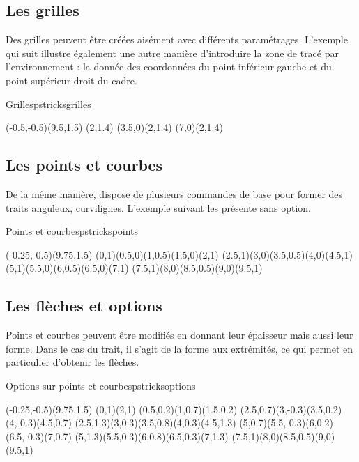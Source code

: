 \subsection{Les grilles}

Des grilles peuvent être créées aisément avec différents paramétrages. L'exemple qui suit illustre également une autre manière d'introduire la zone de tracé par l'environnement  : la donnée des coordonnées du point inférieur gauche et du point supérieur droit du cadre.

\begin{codedoublefig}{Grilles}{pstricksgrilles}
\begin{pspicture}(-0.5,-0.5)(9.5,1.5)
\psgrid(2,1.4)
\rput(3.5,0){\psgrid[griddots=10,subgriddiv=3,subgridcolor=bleu6](2,1.4)}
\rput(7,0){\psgrid[gridwidth=0.07,subgriddiv=0](2,1.4)}
\end{pspicture}
\end{codedoublefig}

\subsection{Les points et courbes}

De la même manière,  dispose de plusieurs commandes de base pour former des traits anguleux, curvilignes. L'exemple suivant les présente sans option.

\begin{codedoublefig}{Points et courbes}{pstrickspoints}
\begin{pspicture}(-0.25,-0.5)(9.75,1.5)
\psdots(0,1)(0.5,0)(1,0.5)(1.5,0)(2,1)
\psline(2.5,1)(3,0)(3.5,0.5)(4,0)(4.5,1)
\pscurve(5,1)(5.5,0)(6,0.5)(6.5,0)(7,1)
\psccurve(7.5,1)(8,0)(8.5,0.5)(9,0)(9.5,1)
\end{pspicture}
\end{codedoublefig}


\subsection{Les flèches et options}

Points et courbes peuvent être modifiés en donnant leur épaisseur mais aussi leur forme. Dans le cas du trait, il s'agit de la forme aux extrémités, ce qui permet en particulier d'obtenir les flèches.

\begin{codedoublefig}{Options sur points et courbes}{pstricksoptions}
\begin{pspicture}(-0.25,-0.5)(9.75,1.5)
\psdots[dotstyle=square*](0,1)(2,1)
\psdots[dotstyle=triangle,dotsize=0.2](0.5,0.2)(1,0.7)(1.5,0.2)
\psline[doubleline=true](2.5,0.7)(3,-0.3)(3.5,0.2)(4,-0.3)(4.5,0.7)
\psline[linewidth=0.1](2.5,1.3)(3,0.3)(3.5,0.8)(4,0.3)(4.5,1.3)
\pscurve[linecolor=bleu6]{|-*}(5,0.7)(5.5,-0.3)(6,0.2)(6.5,-0.3)(7,0.7)
\pscurve[arrowscale=2]{->}(5,1.3)(5.5,0.3)(6,0.8)(6.5,0.3)(7,1.3)
\psccurve*[linecolor=bleu6](7.5,1)(8,0)(8.5,0.5)(9,0)(9.5,1)
\end{pspicture}
\end{codedoublefig}

